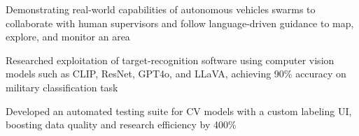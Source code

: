 \begin{zitemize}
	\item Demonstrating real-world capabilities of autonomous vehicles swarms to collaborate with human supervisors and follow language-driven guidance to map, explore, and monitor an area
	\item Researched exploitation of target-recognition software using computer vision models such as CLIP, ResNet, GPT4o, and LLaVA, achieving 90\% accuracy on military classification task
	\item Developed an automated testing suite for CV models with a custom labeling UI, boosting data quality and research efficiency by 400\%

\end{zitemize}

